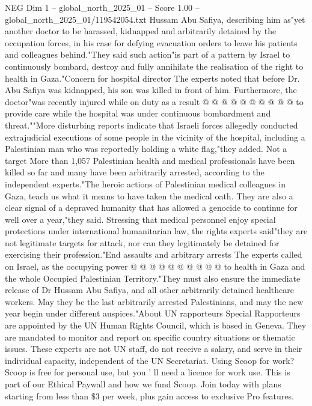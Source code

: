 \begin{textsample}{NEG Dim 1 – global\_north\_2025\_01 – Score 1.00 – global\_north\_2025\_01/119542054.txt}
Hussam Abu Safiya, describing him as"yet another doctor to be harassed, kidnapped and arbitrarily detained by the occupation forces, in his case for defying evacuation orders to leave his patients and colleagues behind."They said such action"is part of a pattern by Israel to continuously bombard, destroy and fully annihilate the realisation of the right to health in Gaza."Concern for hospital director The experts noted that before Dr.
Abu Safiya was kidnapped, his son was killed in front of him.
Furthermore, the doctor"was recently injured while on duty as a result @ @ @ @ @ @ @ @ @ @ to provide care while the hospital was under continuous bombardment and threat.""More disturbing reports indicate that Israeli forces allegedly conducted extrajudicial executions of some people in the vicinity of the hospital, including a Palestinian man who was reportedly holding a white flag,"they added.
Not a target More than 1,057 Palestinian health and medical professionals have been killed so far and many have been arbitrarily arrested, according to the independent experts."The heroic actions of Palestinian medical colleagues in Gaza, teach us what it means to have taken the medical oath.
They are also a clear signal of a depraved humanity that has allowed a genocide to continue for well over a year,"they said.
Stressing that medical personnel enjoy special protections under international humanitarian law, the rights experts said"they are not legitimate targets for attack, nor can they legitimately be detained for exercising their profession."End assaults and arbitrary arrests The experts called on Israel, as the occupying power @ @ @ @ @ @ @ @ @ @ to health in Gaza and the whole Occupied Palestinian Territory."They must also ensure the immediate release of Dr Hussam Abu Safiya, and all other arbitrarily detained healthcare workers.
May they be the last arbitrarily arrested Palestinians, and may the new year begin under different auspices."About UN rapporteurs Special Rapporteurs are appointed by the UN Human Rights Council, which is based in Geneva.
They are mandated to monitor and report on specific country situations or thematic issues.
These experts are not UN staff, do not receive a salary, and serve in their individual capacity, independent of the UN Secretariat.
Using Scoop for work?
Scoop is free for personal use, but you ' ll need a licence for work use.
This is part of our Ethical Paywall and how we fund Scoop.
Join today with plans starting from less than \$3 per week, plus gain access to exclusive Pro features.

\end{textsample}
